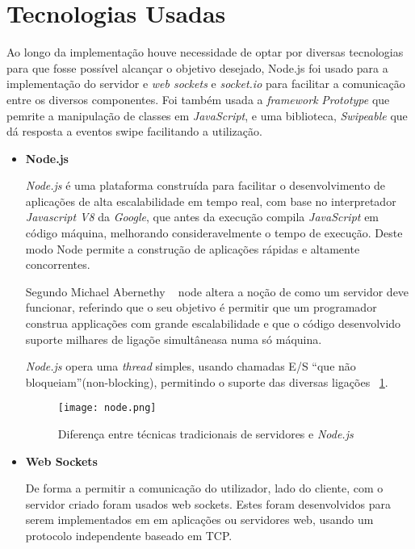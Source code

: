 \section{Tecnologias Usadas} \label{sec:tec}

Ao longo da implementação houve necessidade de optar por diversas tecnologias para que fosse possível alcançar o objetivo desejado, Node.js foi usado para a implementação do servidor e \textit{web sockets} e \textit{socket.io} para facilitar a comunicação entre os diversos componentes. Foi também usada a \textit{framework} \textit{Prototype} que pemrite a manipulação de classes em \textit{JavaScript}, e uma biblioteca, \textit{Swipeable} que dá resposta a eventos swipe facilitando a utilização.

\begin{itemize}

\item \textbf{Node.js}


\textit{Node.js} é uma plataforma construída para facilitar o desenvolvimento de aplicações de alta escalabilidade em tempo real, com base no interpretador \textit{Javascript V8} da \textit{Google}, que antes da execução compila \textit{JavaScript} em código máquina, melhorando consideravelmente o tempo de execução. Deste modo Node permite a construção de aplicações rápidas e altamente concorrentes.

Segundo Michael Abernethy ~\cite{Abernethy2011} node altera a noção de como um servidor deve funcionar, referindo que o seu objetivo é permitir que um programador construa applicações com grande escalabilidade e que o código desenvolvido suporte milhares de ligaçõe simultâneasa numa só máquina. 

\textit{Node.js} opera uma \textit{thread} simples, usando chamadas E/S “que não bloqueiam”(non-blocking), permitindo o suporte das diversas ligações ~\ref{fig:node}.

\begin{figure}[ht]
\centering
\texttt{[image: node.png]}
\caption[\textit{Node.js}] {Diferença entre técnicas tradicionais de servidores e \textit{Node.js}\protect\footnotemark}
\label{fig:node}
\end{figure}


\item \textbf{Web Sockets}

De forma a permitir a comunicação do utilizador, lado do cliente, com o servidor criado foram usados web sockets. Estes foram desenvolvidos para serem implementados em em aplicações ou servidores web, usando um protocolo independente baseado em TCP.


\end{itemize}

